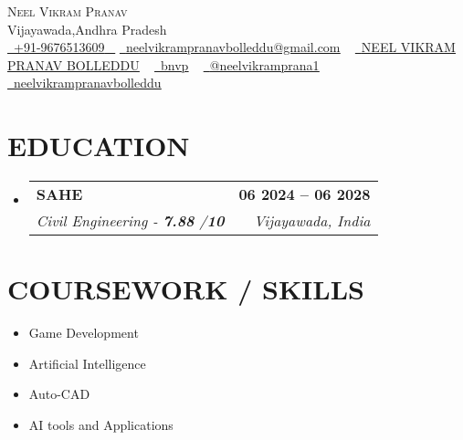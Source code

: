 \documentclass[letterpaper,11pt]{article}
\makeatletter
\newcommand{\resumeSubheading}[4]{
  \vspace{-2pt}\item
    \begin{tabular*}{1.0\textwidth}[t]{l@{\extracolsep{\fill}}r}
      \textbf{\large#1} & \textbf{\small #2} \\
      \textit{\large#3} & \textit{\small #4} \\
     
    \end{tabular*}\vspace{-7pt}
}
\newcommand{\resumeSubHeadingListStart}{\begin{itemize}[leftmargin=0.0in, label={}]}
\newcommand{\resumeSubHeadingListEnd}{\end{itemize}}
\makeatother
\begin{document}




\begin{center}
    {\Huge \scshape Neel Vikram Pranav} \\ \vspace{1pt}
    Vijayawada,Andhra Pradesh \\ \vspace{1pt}
    \small \href{tel:+919676513609}{ \raisebox{-0.1\height}\faPhone\ \underline{+91-9676513609} ~} \href{mailto:neelvikrampranavbolleddu@gmail.com}{\raisebox{-0.2\height}\faEnvelope\  \underline{neelvikrampranavbolleddu@gmail.com}} ~
    \href{https://linkedin.com/in/yourid}{\raisebox{-0.2\height}\faLinkedinSquare\ \underline{NEEL VIKRAM PRANAV BOLLEDDU}}  ~
    \href{https://github.com/yourid}{\raisebox{-0.2\height}\faGithub\ \underline{bnvp}} ~
    \href{https://www.hackerrank.com/yourid}{\raisebox{-0.2\height}\faHackerrank\ \underline{@neelvikramprana1}} ~
    \href{https://codeforces.com/profile/yourid}{\raisebox{-0.2\height}\faPoll\ \underline{neelvikrampranavbolleddu}}
    \vspace{-8pt}
\end{center}




\section{EDUCATION}
  \resumeSubHeadingListStart
    \resumeSubheading
      {SAHE}{06 2024 -- 06 2028}
      {Civil Engineering - \textbf{7.88} /\textbf{10}}{ Vijayawada, India}
  \resumeSubHeadingListEnd

\section{COURSEWORK / SKILLS}
        \begin{multicols}{4}
            \begin{itemize}[itemsep=-2pt, parsep=5pt]
                \item Game Development
               \item Artificial Intelligence
                \item Auto-CAD
                \item AI tools and Applications
            \end{itemize}
        \end{multicols}
        \vspace*{2.0\multicolsep}
\end{document}
